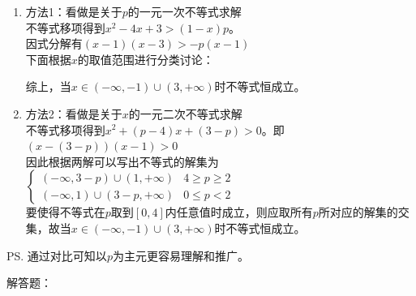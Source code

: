 \begin{enumerate}
\begin{jieda}
\begin{enumerate}
            \item 方法1：看做是关于$p$的一元一次不等式求解 \\
            不等式移项得到$x^2 -4x + 3 > (1-x)p$。\\
            因式分解有$(x-1)(x-3) > -p(x-1)$ \\
            下面根据$x$的取值范围进行分类讨论：
            综上，当$x \in (-\infty, -1) \cup (3, +\infty)$时不等式恒成立。
            \item 方法2：看做是关于$x$的一元二次不等式求解 \\
            不等式移项得到$x^2 + (p-4)x + (3-p) > 0$。即$(x-(3-p))(x-1) > 0$ \\
            因此根据两解可以写出不等式的解集为$\left \{
                \begin{array}{ll}
                     (-\infty, 3-p) \cup (1, +\infty) & 4 \geq p \geq 2 \\
                     (-\infty, 1) \cup (3-p, +\infty) & 0 \leq p < 2
                \end{array}
            \right. $ \\
            要使得不等式在$p$取到$[0, 4]$内任意值时成立，则应取所有$p$所对应的解集的交集，故当$x \in (-\infty, -1) \cup (3, +\infty)$时不等式恒成立。
        \end{enumerate}
        \ps 通过对比可知以$p$为主元更容易理解和推广。
    \end{jieda}
\end{enumerate}
解答题：
